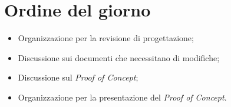 \section{Ordine del giorno}
\begin{itemize}
\item Organizzazione per la revisione di progettazione;
\item Discussione sui documenti che necessitano di modifiche;
\item Discussione sul \textit{Proof of Concept};
\item Organizzazione per la presentazione del \textit{Proof of Concept}.
\end{itemize}